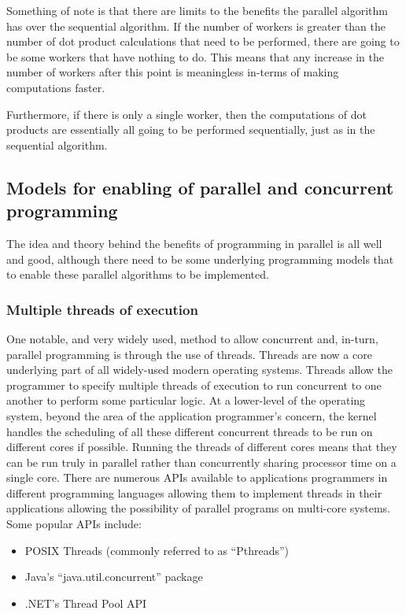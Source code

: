 \documentclass[a4paper,11pt]{article}
\begin{document}
Something of note is that there are limits to the benefits the parallel algorithm has over the sequential algorithm.
If the number of workers is greater than the number of dot product calculations that need to be performed, there
are going to be some workers that have nothing to do. This means that any increase in the number of workers after this point
is meaningless in-terms of making computations faster.

Furthermore, if there is only a single worker, then the computations of dot products are essentially all going to be performed
sequentially, just as in the sequential algorithm.

\subsection{Models for enabling of parallel and concurrent programming} %
\label{sub:enablers_for_programming_in_parallel}
The idea and theory behind the benefits of programming in parallel is all well and good, although there need to be some
underlying programming models that to enable these parallel algorithms to be implemented.

\subsubsection{Multiple threads of execution} %
\label{ssub:threads_execution}
One notable, and very widely
used, method to allow concurrent and, in-turn, parallel programming is through the use of threads. Threads are now a core
underlying part of all widely-used modern operating systems. Threads allow the programmer to specify multiple threads
of execution to run concurrent to one another to perform some particular logic. At a lower-level of the operating system,
beyond the area of the application programmer's concern, the kernel handles the scheduling of all these different concurrent threads
to be run on different cores if possible. Running the threads of different cores means that they can be run truly in parallel
rather than concurrently sharing processor time on a single core. There are numerous APIs available to applications programmers
in different programming languages
allowing them to implement threads in their applications allowing the possibility of parallel programs on multi-core systems.
Some popular APIs include:
\begin{itemize}
  \item POSIX Threads (commonly referred to as ``Pthreads'')
  \item Java's ``java.util.concurrent'' package
  \item .NET's Thread Pool API
\end{itemize}
\end{document}
